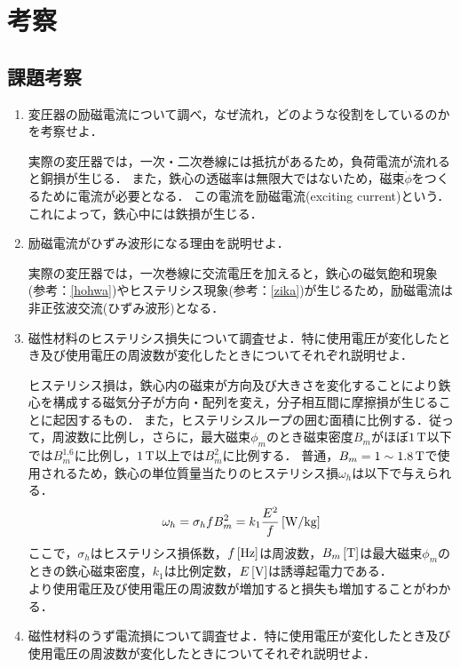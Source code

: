 \clearpage

\section{考察}
\subsection{課題考察}
\begin{enumerate}[1.]
	\item 変圧器の励磁電流について調べ，なぜ流れ，どのような役割をしているのかを考察せよ．\cite{1130282270091029760}
	
	実際の変圧器では，一次・二次巻線には抵抗があるため，負荷電流が流れると銅損が生じる．
	また，鉄心の透磁率は無限大ではないため，磁束$\dot{\phi}$をつくるために電流が必要となる．
	この電流を励磁電流(exciting current)という．
	これによって，鉄心中には鉄損が生じる．
	\item 励磁電流がひずみ波形になる理由を説明せよ．
	
	実際の変圧器では，一次巻線に交流電圧を加えると，鉄心の磁気飽和現象(参考：\ref{hohwa})やヒステリシス現象(参考：\ref{zika})が生じるため，励磁電流は非正弦波交流(ひずみ波形)となる\cite{1130282270091029760}．
	\item 磁性材料のヒステリシス損失について調査せよ．特に使用電圧が変化したとき及び使用電圧の周波数が変化したときについてそれぞれ説明せよ．\cite{11302822718577152}
	\label{hlos}
	
	ヒステリシス損は，鉄心内の磁束が方向及び大きさを変化することにより鉄心を構成する磁気分子が方向・配列を変え，分子相互間に摩擦損が生じることに起因するもの．
	また，ヒステリシスループの囲む面積に比例する．従って，周波数に比例し，さらに，最大磁束$\phi_{m}$のとき磁束密度$B_{m}$がほぼ$1\,\rm{T}$以下では$B_{m}^{1.6}$に比例し，$1\,\rm{T}$以上では$B_{m}^{2}$に比例する．
	普通，$B_{m}=1 \sim 1.8\,\rm{T}$で使用されるため，鉄心の単位質量当たりのヒステリシス損$\omega_{h}$は以下で与えられる．
	\begin{equation}
		\omega_{h}=\sigma_{h}fB_{m}^{2}=k_{1}\frac{E^{2}}{f}\,[\rm{W/kg}]
		\label{eq:he}
	\end{equation}
	ここで，$\sigma_{h}$はヒステリシス損係数，$f\,[\rm{Hz}]$は周波数，$B_{m}\,[\rm{T}]$は最大磁束$\phi_{m}$のときの鉄心磁束密度，$k_{1}$は比例定数，$E\,[\rm{V}]$は誘導起電力である．\\
	より使用電圧及び使用電圧の周波数が増加すると損失も増加することがわかる．
	\item 磁性材料のうず電流損について調査せよ．特に使用電圧が変化したとき及び使用電圧の周波数が変化したときについてそれぞれ説明せよ．\cite{11302822718577152}
	\label{uzu}
	

\end{enumerate}

